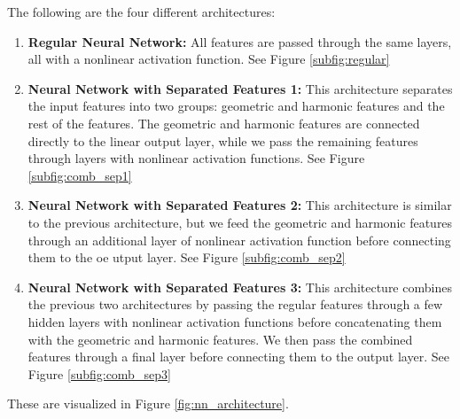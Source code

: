 The following are the four different architectures:
\begin{enumerate}
    \item \textbf{Regular Neural Network:} All features are passed through the same layers, all with a nonlinear activation function.
    See Figure \ref{subfig:regular}
    \item \textbf{Neural Network with Separated Features 1:} This architecture separates the input features into two groups: geometric and harmonic features and the rest of the features.
    The geometric and harmonic features are connected directly to the linear output layer, while we pass the remaining features through layers with nonlinear activation functions.
    See Figure \ref{subfig:comb_sep1}
    \item \textbf{Neural Network with Separated Features 2:} This architecture is similar to the previous architecture,
    but we feed the geometric and harmonic features through an additional layer of nonlinear activation function before connecting them to the oe utput layer.
    See Figure \ref{subfig:comb_sep2}
    \item \textbf{Neural Network with Separated Features 3:} This architecture combines the previous two architectures by passing the regular features through a few hidden layers with nonlinear activation functions before concatenating them with the geometric and harmonic features.
    We then pass the combined features through a final layer before connecting them to the output layer.
    See Figure \ref{subfig:comb_sep3}
\end{enumerate}
These are visualized in Figure \ref{fig:nn_architecture}.


